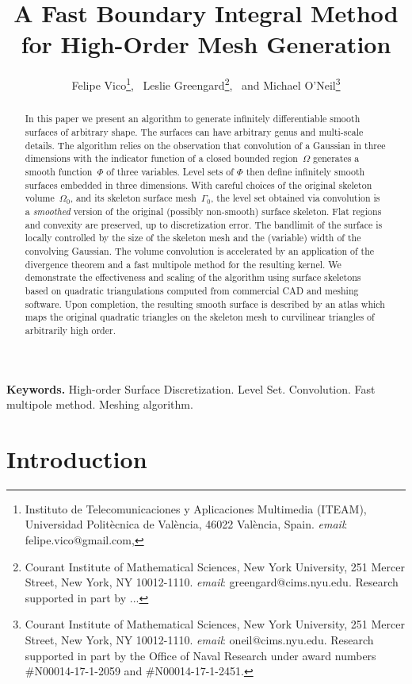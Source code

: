 \documentclass[11pt]{article}
\title{\bf{A Fast Boundary Integral Method
    for High-Order Mesh Generation}}
\author{Felipe Vico\thanks{Instituto de Telecomunicaciones y
    Aplicaciones Multimedia (ITEAM), 
    Universidad Polit\`ecnica
    de Val\`encia, 46022 Val\`encia, Spain.
    {\em email}: {\sf felipe.vico@gmail.com,}}, \,
Leslie Greengard\thanks{Courant Institute of Mathematical Sciences,
         New York University, 
         251 Mercer Street,
         New York, NY 10012-1110.
{\em email}: {\sf greengard@cims.nyu.edu}. Research supported in
    part by ... }, \, 
and Michael O'Neil\thanks{Courant Institute of Mathematical Sciences,
         New York University, 
         251 Mercer Street,
         New York, NY 10012-1110.
{\em email}: {\sf oneil@cims.nyu.edu}. Research supported in part by
  the Office of Naval Research under award numbers
    \#N00014-17-1-2059 and \#N00014-17-1-2451.}}
\date{}
\numberwithin{equation}{section}
\begin{document}
\maketitle




\begin{abstract}
  In this paper we present an algorithm to generate infinitely
  differentiable smooth surfaces of arbitrary shape. The surfaces can
  have arbitrary genus and multi-scale details.  The algorithm relies
  on the observation that convolution of a Gaussian in three
  dimensions with the indicator function of a closed bounded
  region~$\Omega$ generates a smooth function~$\Phi$ of three
  variables. Level sets of $\Phi$ then define infinitely smooth
  surfaces embedded in three dimensions.  With careful choices of the
  original skeleton volume~$\Omega_0$, and its skeleton surface
  mesh~$\Gamma_0$, the level set obtained via convolution is a
  \emph{smoothed} version of the original (possibly non-smooth)
  surface skeleton.  Flat regions and convexity are preserved, up to
  discretization error.  The bandlimit of the surface is locally
  controlled by the size of the skeleton mesh and the (variable) width
  of the convolving Gaussian.  The volume convolution is accelerated
  by an application of the divergence theorem and a fast multipole
  method for the resulting kernel.  We demonstrate the effectiveness
  and scaling of the algorithm using surface skeletons based on
  quadratic triangulations computed from commercial CAD and meshing
  software.  Upon completion, the resulting smooth surface is
  described by an atlas which maps the original quadratic triangles on
  the skeleton mesh to curvilinear triangles of arbitrarily high
  order.
\end{abstract}

{\bf Keywords.} High-order Surface Discretization.
Level Set. Convolution.
  Fast multipole method. Meshing algorithm.



\section{Introduction}
\end{document}
